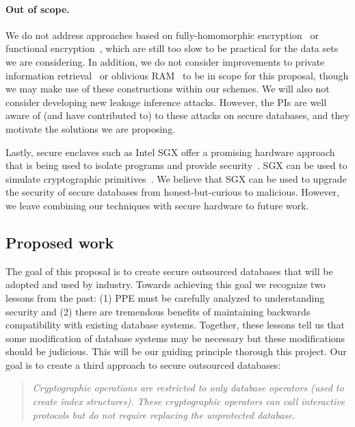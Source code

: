 \paragraph{Out of scope.} We do not address approaches based on
fully-homomorphic encryption~\cite{STOC:Gentry09} or functional
encryption~\cite{FOCS:GGHRSW13}, which are still too slow to be
practical for the data sets we are considering.
In addition, we do not
consider improvements to private information
retrieval~\cite{FOCS:CGKS95} or oblivious
RAM~\cite{STOC:Goldreich87,goldreich1996software} to be in scope for
this proposal, though we may make use of these constructions within our
schemes.
We will also not consider developing new leakage inference attacks.
However, the PIs are well aware of (and have contributed to) to these attacks on
secure databases, and they motivate the solutions we are
proposing.

Lastly, secure enclaves such as Intel SGX offer a promising hardware approach that is being used to isolate programs and provide security~\cite{EPRINT:CosDev16}.  SGX can be used to simulate cryptographic primitives~\cite{EPRINT:SasGorFle17,EPRINT:FVBG16}.  We believe that SGX can be used to upgrade the security of secure databases from honest-but-curious to malicious.  However, we leave combining our techniques with secure hardware to future work.


\subsection{Proposed work}
The goal of this proposal is to create secure outsourced databases that
will be adopted and used by industry.  Towards achieving this goal we
recognize two lessons from the past: (1) PPE must be carefully analyzed
to understanding security and (2) there are tremendous benefits of
maintaining backwards compatibility with existing database systems.
Together, these lessons tell us that some modification of database
systems may be necessary but these modifications should be judicious.
This will be our guiding principle thorough this project.  Our goal is to create a third approach to secure outsourced databases: 
\begin{quote}\emph{Cryptographic operations are restricted to only
database operators (used to create index structures).  These
cryptographic operators can call interactive protocols but do not
require replacing the unprotected database. }
\end{quote}

